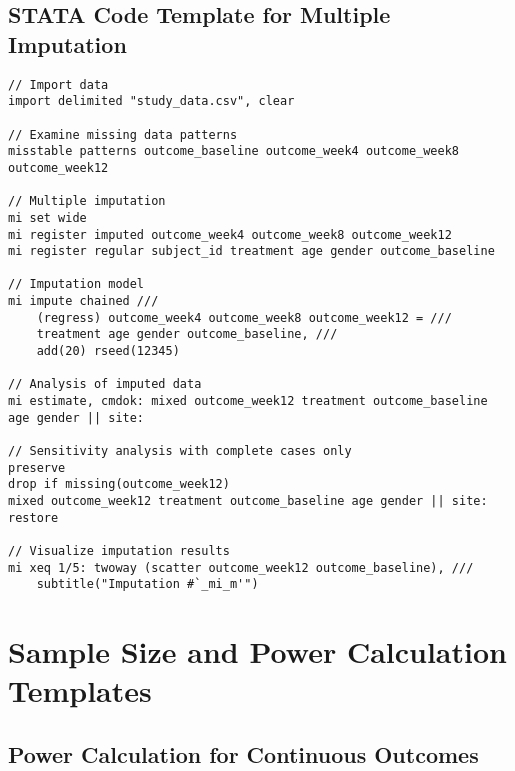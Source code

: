 \subsection{STATA Code Template for Multiple Imputation}

\begin{tcolorbox}[title=STATA Code for Multiple Imputation]
\begin{verbatim}
// Import data
import delimited "study_data.csv", clear

// Examine missing data patterns
misstable patterns outcome_baseline outcome_week4 outcome_week8 outcome_week12

// Multiple imputation
mi set wide
mi register imputed outcome_week4 outcome_week8 outcome_week12
mi register regular subject_id treatment age gender outcome_baseline

// Imputation model
mi impute chained ///
    (regress) outcome_week4 outcome_week8 outcome_week12 = ///
    treatment age gender outcome_baseline, ///
    add(20) rseed(12345)

// Analysis of imputed data
mi estimate, cmdok: mixed outcome_week12 treatment outcome_baseline age gender || site:

// Sensitivity analysis with complete cases only
preserve
drop if missing(outcome_week12)
mixed outcome_week12 treatment outcome_baseline age gender || site:
restore

// Visualize imputation results
mi xeq 1/5: twoway (scatter outcome_week12 outcome_baseline), ///
    subtitle("Imputation #`_mi_m'")
\end{verbatim}
\end{tcolorbox}

\section{Sample Size and Power Calculation Templates}

\subsection{Power Calculation for Continuous Outcomes}

